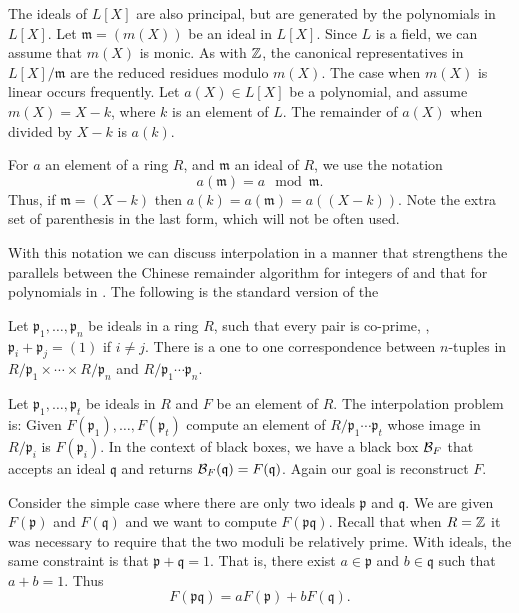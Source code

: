 The ideals of $L[X]$ are also principal, but are generated by the
polynomials in $L[X]$.  Let $\mathfrak{m} = (m(X))$ be an ideal in
$L[X]$.  Since $L$ is a field, we can assume that $m(X)$ is monic.  As
with $\mathbb{Z}$, the canonical representatives in $L[X]/\mathfrak{m}$ are the
reduced residues modulo $m(X)$.  The case when $m(X)$ is linear occurs
frequently.  Let $a(X) \in L[X]$ be a polynomial, and assume $m(X) = X
- k$, where $k$ is an element of $L$.  The remainder of $a(X)$ when
divided by $X - k$ is $a(k)$.

For $a$ an element of a ring $R$, and $\mathfrak{m}$ an ideal of $R$, we
use the notation
\[
a(\mathfrak{m}) = a \mod\mathfrak{m}.
\]
Thus, if $\mathfrak{m} = (X - k)$ then $a(k) = a(\mathfrak{m}) = a((X -
k))$.  Note the extra set of parenthesis in the last form, which will
not be often used.  

\medskip
With this notation we can discuss interpolation in a manner that
strengthens the parallels between the Chinese remainder algorithm for
integers of  and that for
polynomials in .  The following is the
standard version of the 

\begin{proposition}
Let $\mathfrak{p}_1, \ldots, \mathfrak{p}_n$ be ideals in a ring $R$, such
that every pair is co-prime, \ie, $\mathfrak{p}_i + \mathfrak{p}_j = (1)$ if
$i\not=j$.  There is a one to one correspondence between $n$-tuples in
$R/\mathfrak{p}_1 \times \cdots \times R/\mathfrak{p}_n$ and $R/\mathfrak{p}_1
\cdots \mathfrak{p}_n$.
\end{proposition}

Let $\mathfrak{p}_1, \ldots, \mathfrak{p}_t$ be ideals in $R$ and $F$
be an element of $R$.  The interpolation problem is: Given
$F(\mathfrak{p}_1), \ldots, F(\mathfrak{p}_t)$ compute an element of
$R/\mathfrak{p}_1 \cdots \mathfrak{p}_t$ whose image in
$R/\mathfrak{p}_i$ is $F(\mathfrak{p}_i)$.  In the context of black
boxes, we have a black box ${\cal B}_F$ that accepts an ideal
$\mathfrak{q}$ and returns ${\cal B}_F(\mathfrak{q}) = F(\mathfrak{q})$.
Again our goal is reconstruct $F$.

Consider the simple case where there are only two ideals $\mathfrak{p}$
and $\mathfrak{q}$.  We are given $F(\mathfrak{p})$ and $F(\mathfrak{q})$ and
we want to compute $F(\mathfrak{pq})$.  Recall that when $R = \mathbb{Z}$ it was
necessary to require that the two moduli be relatively prime.  With
ideals, the same constraint is that $\mathfrak{p} + \mathfrak{q} = 1$.  That
is, there exist $a \in \mathfrak{p}$ and $b \in \mathfrak{q}$ such that
$a+b=1$.  Thus
\[
F(\mathfrak{pq}) = a F(\mathfrak{p}) + b F (\mathfrak{q}).
\]

